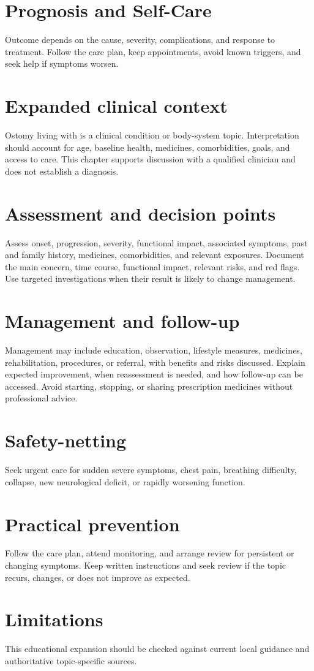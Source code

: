 \section*{Prognosis and Self-Care}
Outcome depends on the cause, severity, complications, and response to treatment. Follow the care plan, keep appointments, avoid known triggers, and seek help if symptoms worsen.

\section*{Expanded clinical context}
Ostomy living with is a clinical condition or body-system topic. Interpretation should account for age, baseline health, medicines, comorbidities, goals, and access to care. This chapter supports discussion with a qualified clinician and does not establish a diagnosis.

\section*{Assessment and decision points}
Assess onset, progression, severity, functional impact, associated symptoms, past and family history, medicines, comorbidities, and relevant exposures. Document the main concern, time course, functional impact, relevant risks, and red flags. Use targeted investigations when their result is likely to change management.

\section*{Management and follow-up}
Management may include education, observation, lifestyle measures, medicines, rehabilitation, procedures, or referral, with benefits and risks discussed. Explain expected improvement, when reassessment is needed, and how follow-up can be accessed. Avoid starting, stopping, or sharing prescription medicines without professional advice.

\section*{Safety-netting}
Seek urgent care for sudden severe symptoms, chest pain, breathing difficulty, collapse, new neurological deficit, or rapidly worsening function.

\section*{Practical prevention}
Follow the care plan, attend monitoring, and arrange review for persistent or changing symptoms. Keep written instructions and seek review if the topic recurs, changes, or does not improve as expected.

\section*{Limitations}
This educational expansion should be checked against current local guidance and authoritative topic-specific sources.
\clearpage
